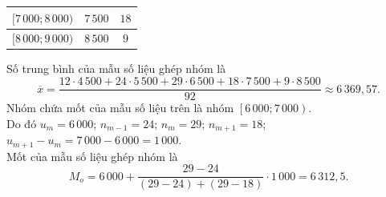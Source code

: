 \begin{ex}
{\begin{listEX}
\begin{center}
\begin{tabular}{|c|c|c|}
					\hline 
					$[7\,000; 8\,000)$ &$7\,500$&$18$\\ 
					\hline 
					$[8\,000; 9\,000)$  &$8\,500$&$9$\\
					\hline 
				\end{tabular}
			\end{center}
			\item Số trung bình của mẫu số liệu ghép  nhóm là
			\[\overline{x}=\dfrac{12\cdot 4\,500+24\cdot 5\,500+29\cdot 6\,500+18\cdot  7\,500+9\cdot 8\,500}{92} \approx 6\,369{,}57.\]
			Nhóm  chứa mốt của mẫu số liệu trên là nhóm $\left[6\,000;7\,000 \right)$.\\
			Do  đó $u_m=6\,000$; $n_{m-1}=24$; $n_m=29$; $n_{m+1}=18$; $u_{m+1}-u_m=7\,000-6\,000=1\,000$.\\
			Mốt của  mẫu số liệu ghép nhóm là
			\[M_o=6\,000+\dfrac{29-24}{(29-24)+(29-18)}  \cdot 1\,000=6\,312{,}5.\]
		\end{listEX}
	} 
\end{ex}

